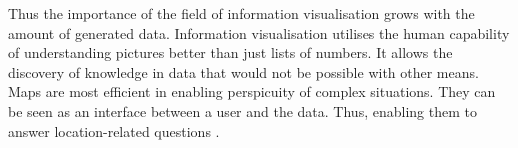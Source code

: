 Thus the importance of the field of information visualisation grows with the amount of generated data. Information visualisation utilises the human capability of understanding pictures better than just lists of numbers. It allows the discovery of knowledge in data that would not be possible with other means. Maps are most efficient in enabling perspicuity of complex situations. They can be seen as an interface between a user and the data. Thus, enabling them to answer location-related questions .
